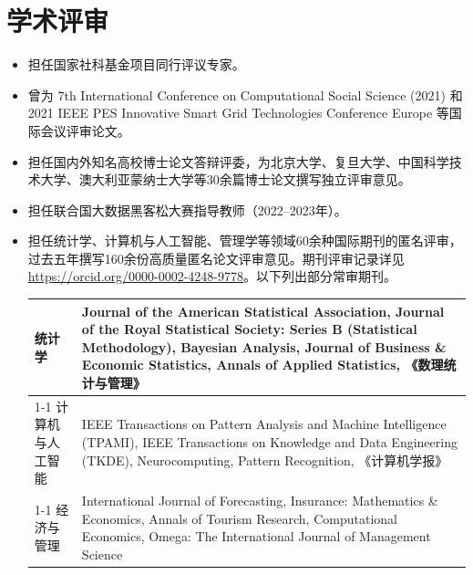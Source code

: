 \documentclass[twoside,a4paper,11pt]{article}
\begin{document}
\section{学术评审}

\begin{itemize}

\item   担任国家社科基金项目同行评议专家。
\item   曾为 7th International Conference on Computational Social Science (2021) 和 2021 IEEE PES Innovative Smart Grid Technologies Conference Europe 等国际会议评审论文。
\item   担任国内外知名高校博士论文答辩评委，为北京大学、复旦大学、中国科学技术大学、澳大利亚蒙纳士大学等30余篇博士论文撰写独立评审意见。
\item   担任联合国大数据黑客松大赛指导教师（2022--2023年）。
\item   担任统计学、计算机与人工智能、管理学等领域60余种国际期刊的匿名评审，过去五年撰写160余份高质量匿名论文评审意见。期刊评审记录详见 \url{https://orcid.org/0000-0002-4248-9778}。以下列出部分常审期刊。

  \begin{tabular}{lp{12cm}}
    \toprule
    统计学 &
             Journal of the American Statistical Association,
             Journal of the Royal Statistical Society: Series B (Statistical Methodology),
             Bayesian Analysis,
             Journal of Business \& Economic Statistics,
             Annals of Applied Statistics,
             《数理统计与管理》\\
    \cline{1-1}
    计算机与人工智能 &
                       IEEE Transactions on Pattern Analysis and Machine Intelligence (TPAMI),
                       IEEE Transactions on Knowledge and Data Engineering (TKDE),
                       Neurocomputing,
                       Pattern Recognition,
                       《计算机学报》\\
    \cline{1-1}
    经济与管理 &
                 International Journal of Forecasting,
                 Insurance: Mathematics \& Economics,
                 Annals of Tourism Research,
                 Computational Economics,
                 Omega: The International Journal of Management Science\\
    \bottomrule
  \end{tabular}

\end{itemize}
\end{document}
